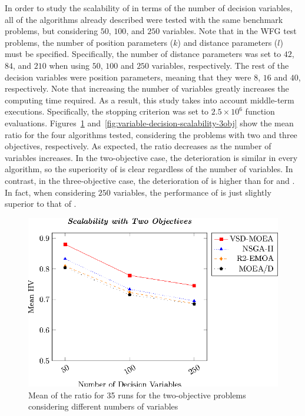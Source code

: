In order to study the scalability of \VSDMOEA{} in terms of the number of decision variables, all of the algorithms already described were tested with
the same benchmark problems, but considering $50$, $100$, and $250$ variables.
%
Note that in the WFG test problems, the number of position parameters ($k$) and distance parameters ($l$) must be specified.
%
Specifically, the number of distance parameters was set to $42$, $84$, and $210$ when using $50$, $100$ and $250$ variables, respectively.
%
The rest of the decision variables were position parameters, meaning that they were $8$, $16$ and $40$, respectively.
%
Note that increasing the number of variables greatly increases the computing time required.
%
As a result, this study takes into account middle-term executions.
%
Specifically, the stopping criterion was set to $2.5 \times 10^6$ function evaluations.
%
Figures~\ref{fig:variable-decision-scalability-2obj} and~\ref{fig:variable-decision-scalability-3obj} 
show the mean \HV{} ratio for the four algorithms tested,
considering the problems with two and three objectives, respectively.
%
As expected, the \HV{} ratio decreases as the number of variables increases.
%
In the two-objective case, the deterioration is similar in every algorithm, so the superiority of \VSDMOEA{} is clear regardless of the number of 
variables.
%
In contrast, in the three-objective case, the deterioration of \VSDMOEA{} is higher than for \RMOEA{} and \MOEAD{}.
%
In fact, when considering $250$ variables, the performance of \VSDMOEA{} is just slightly superior to that of \RMOEA{}.

\begin{figure}[t]
\centering
\includegraphics[scale=0.85]{Images/Graphic-Scalability-2obj_tikz-figure0.eps}
\caption{Mean of the \HV{} ratio for 35 runs for the two-objective problems considering different numbers of variables}\label{fig:variable-decision-scalability-2obj}
\end{figure}

